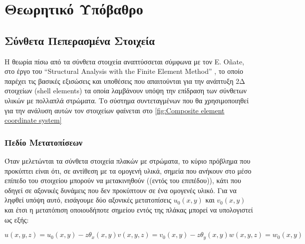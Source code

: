 \chapter{Θεωρητικό Υπόβαθρο}
\label{Ch:Theory}

\section{Σύνθετα Πεπερασμένα Στοιχεία}\label{composite-finite-elements}

Η θεωρία πίσω από τα σύνθετα στοιχεία αναπτύσσεται σύμφωνα με τον \textlatin{E. Oñate}, στο έργο του \textlatin{``Structural Analysis with the Finite Element Method''} \cite{onate2013}, το οποίο παρέχει τις βασικές εξισώσεις και υποθέσεις που απαιτούνται για την ανάπτυξη 2Δ στοιχείων \textlatin{(shell elements)} τα οποία λαμβάνουν υπόψη την επίδραση των σύνθετων υλικών με πολλαπλά στρώματα. Το σύστημα συντεταγμένων που θα χρησιμοποιηθεί για την ανάλυση αυτών τον στοιχείων φαίνεται στο \autoref{fig:Composite element coordinate system}

\subsection{Πεδίο Μετατοπίσεων}\label{displacement-field}

Όταν μελετώνται τα σύνθετα στοιχεία πλακών με στρώματα, το κύριο πρόβλημα που προκύπτει είναι ότι, σε αντίθεση με τα ομογενή υλικά, σημεία που ανήκουν στο μέσο επίπεδο του στοιχείου μπορούν να μετακινηθούν ((εντός του επιπέδου)), κάτι που οδηγεί σε αξονικές δυνάμεις που δεν προκύπτουν σε ένα ομογενές υλικό. Για να ληφθεί υπόψη αυτό, εισάγουμε δύο αξονικές μετατοπίσεις $u_0(x,y)$ και $v_0(x,y)$ και έτσι η μετατόπιση οποιουδήποτε σημείου εντός της πλάκας μπορεί να υπολογιστεί ως εξής:

\foreignlanguage{english}{
\begin{subequations}
    \label{eq:disp_field}
    \begin{equation}
        u(x,y,z)=u_0(x,y) -z\theta_x (x,y)
    \end{equation}
    \begin{equation}
        v(x,y,z)=v_0(x,y) -z\theta_y (x,y)
    \end{equation}
    \begin{equation}
        w(x,y,z)=w_0 (x,y)
    \end{equation}
\end{subequations}
}

